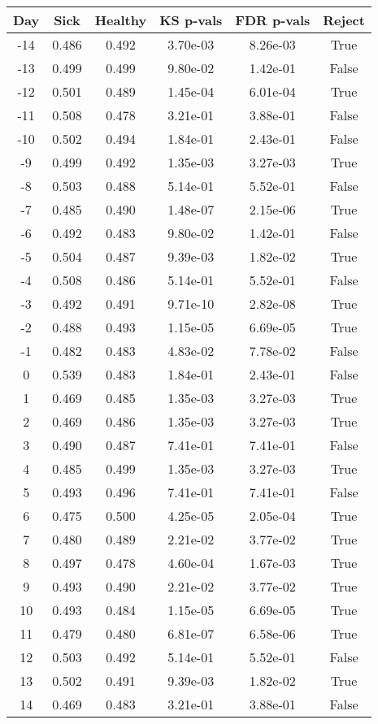 \begin{tabular}{c|c|c|c|c|c}
Day &  Sick & Healthy &  KS p-vals & FDR p-vals & Reject\\
\hline
-14 & 0.486 &   0.492 &   3.70e-03 &   8.26e-03 &   True\\
-13 & 0.499 &   0.499 &   9.80e-02 &   1.42e-01 &  False\\
-12 & 0.501 &   0.489 &   1.45e-04 &   6.01e-04 &   True\\
-11 & 0.508 &   0.478 &   3.21e-01 &   3.88e-01 &  False\\
-10 & 0.502 &   0.494 &   1.84e-01 &   2.43e-01 &  False\\
 -9 & 0.499 &   0.492 &   1.35e-03 &   3.27e-03 &   True\\
 -8 & 0.503 &   0.488 &   5.14e-01 &   5.52e-01 &  False\\
 -7 & 0.485 &   0.490 &   1.48e-07 &   2.15e-06 &   True\\
 -6 & 0.492 &   0.483 &   9.80e-02 &   1.42e-01 &  False\\
 -5 & 0.504 &   0.487 &   9.39e-03 &   1.82e-02 &   True\\
 -4 & 0.508 &   0.486 &   5.14e-01 &   5.52e-01 &  False\\
 -3 & 0.492 &   0.491 &   9.71e-10 &   2.82e-08 &   True\\
 -2 & 0.488 &   0.493 &   1.15e-05 &   6.69e-05 &   True\\
 -1 & 0.482 &   0.483 &   4.83e-02 &   7.78e-02 &  False\\
  0 & 0.539 &   0.483 &   1.84e-01 &   2.43e-01 &  False\\
  1 & 0.469 &   0.485 &   1.35e-03 &   3.27e-03 &   True\\
  2 & 0.469 &   0.486 &   1.35e-03 &   3.27e-03 &   True\\
  3 & 0.490 &   0.487 &   7.41e-01 &   7.41e-01 &  False\\
  4 & 0.485 &   0.499 &   1.35e-03 &   3.27e-03 &   True\\
  5 & 0.493 &   0.496 &   7.41e-01 &   7.41e-01 &  False\\
  6 & 0.475 &   0.500 &   4.25e-05 &   2.05e-04 &   True\\
  7 & 0.480 &   0.489 &   2.21e-02 &   3.77e-02 &   True\\
  8 & 0.497 &   0.478 &   4.60e-04 &   1.67e-03 &   True\\
  9 & 0.493 &   0.490 &   2.21e-02 &   3.77e-02 &   True\\
 10 & 0.493 &   0.484 &   1.15e-05 &   6.69e-05 &   True\\
 11 & 0.479 &   0.480 &   6.81e-07 &   6.58e-06 &   True\\
 12 & 0.503 &   0.492 &   5.14e-01 &   5.52e-01 &  False\\
 13 & 0.502 &   0.491 &   9.39e-03 &   1.82e-02 &   True\\
 14 & 0.469 &   0.483 &   3.21e-01 &   3.88e-01 &  False\\
\end{tabular}